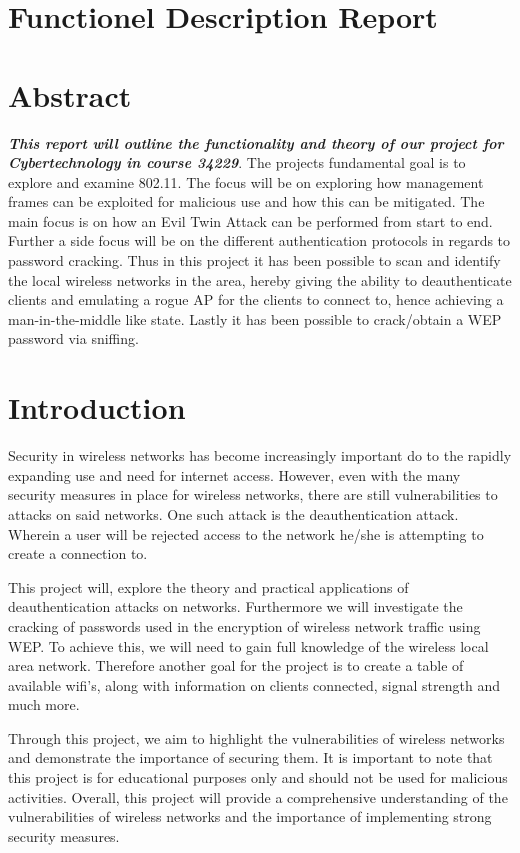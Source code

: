 \section*{Functionel Description Report}
\tableofcontents
\newpage

\section{Abstract}
\textbf{\textit{This report will outline the functionality and theory of our project for Cybertechnology in course 34229}}. The projects fundamental goal is to explore and examine 802.11. The focus will be on exploring how management frames can be exploited for malicious use and how this can be mitigated. The main focus is on how an Evil Twin Attack can be performed from start to end. Further a side focus will be on the different authentication protocols in regards to password cracking. Thus in this project it has been possible to scan and identify the local wireless networks in the area, hereby giving the ability to deauthenticate clients and emulating a rogue AP for the clients to connect to, hence achieving a man-in-the-middle like state. Lastly it has been possible to crack/obtain a WEP password via sniffing.





\section{Introduction}

Security in wireless networks has become increasingly important do to the rapidly expanding use and need for internet access. However, even with the many security measures in place for wireless networks, there are still vulnerabilities to attacks on said networks. One such attack is the deauthentication attack. Wherein a user will be rejected access to the network he/she is attempting to create a connection to.

This project will, explore the theory and practical applications of deauthentication attacks on networks. Furthermore we will investigate the cracking of passwords used in the encryption of wireless network traffic using WEP. To achieve this, we will need to gain full knowledge of the wireless local area network. Therefore another goal for the project is to create a table of available wifi's, along with information on clients connected, signal strength and much more.

Through this project, we aim to highlight the vulnerabilities of wireless networks and demonstrate the importance of securing them. It is important to note that this project is for educational purposes only and should not be used for malicious activities. Overall, this project will provide a comprehensive understanding of the vulnerabilities of wireless networks and the importance of implementing strong security measures.

